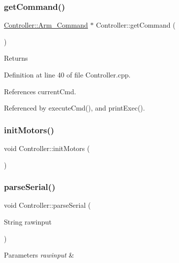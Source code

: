 \subsubsection{\texorpdfstring{get\+Command()}{getCommand()}}
{\footnotesize\ttfamily \hyperlink{class_controller_a1b06b7601d97a4d4bb4071938df87076}{Controller\+::\+Arm\+\_\+\+Command} $\ast$ Controller\+::get\+Command (\begin{DoxyParamCaption}{ }\end{DoxyParamCaption})}

\begin{DoxyReturn}{Returns}

\end{DoxyReturn}


Definition at line 40 of file Controller.\+cpp.



References current\+Cmd.



Referenced by execute\+Cmd(), and print\+Exec().

\mbox{\label{class_controller_a02671eb16452b74848f56f954d8dde1a}} 
\subsubsection{\texorpdfstring{init\+Motors()}{initMotors()}}
{\footnotesize\ttfamily void Controller\+::init\+Motors (\begin{DoxyParamCaption}{ }\end{DoxyParamCaption})}

\mbox{\label{class_controller_ab539c04f3472ce35d99947d145f95b4b}} 
\subsubsection{\texorpdfstring{parse\+Serial()}{parseSerial()}}
{\footnotesize\ttfamily void Controller\+::parse\+Serial (\begin{DoxyParamCaption}\item[{String}]{rawinput }\end{DoxyParamCaption})}


\begin{DoxyParams}{Parameters}
{\em rawinput} & \\
\hline
\end{DoxyParams}


